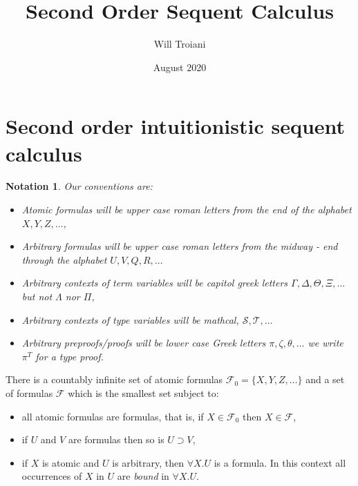 \documentclass[12pt]{article}
\title{Second Order Sequent Calculus}
\author{Will Troiani}
\date{August 2020}
\numberwithin{thm}{subsection}
\numberwithin{defn}{subsection}
\numberwithin{lemma}{subsection}
\numberwithin{example}{subsection}
\newtheorem{notation}{Notation}
\numberwithin{notation}{subsection}
\numberwithin{cor}{subsection}
\numberwithin{remark}{subsection}
\numberwithin{condition}{subsection}
\numberwithin{question}{subsection}
\numberwithin{construction}{subsection}
\newcommand{\scr}[1]{\mathscr{#1}}
\newcommand{\call}[1]{\mathcal{#1}}
\newcommand{\imp}{\supset}
\theoremstyle{example}
\numberwithin{equation}{section}
\begin{document}
\maketitle

%

\section{Second order intuitionistic sequent calculus}

\begin{notation}
Our conventions are:
\begin{itemize}
    \item Atomic formulas will be upper case roman letters from the end of the alphabet $X,Y,Z, \hdots$,
    \item Arbitrary formulas will be upper case roman letters from the midway - end through the alphabet $U,V,Q,R, \hdots$
    \item Arbitrary contexts of term variables will be capitol greek letters $\Gamma, \Delta, \Theta, \Xi,\hdots$ but not $\Lambda$ nor $\Pi$,
    \item Arbitrary contexts of type variables will be mathcal, $\call{S},\call{T},\hdots$
    \item Arbitrary preproofs/proofs will be lower case Greek letters $\pi, \zeta, \theta, \hdots$ we write $\pi^T$ for a type proof.
\end{itemize}
\end{notation}
There is a countably infinite set of atomic formulas $\scr{F}_0 = \lbrace X, Y, Z,\hdots \rbrace$ and a set of formulas $\scr{F}$ which is the smallest set subject to:
\begin{itemize}
    \item all atomic formulas are formulas, that is, if $X \in \scr{F}_0$ then $X \in \scr{F}$,
    \item if $U$ and $V$ are formulas then so is $U \imp V$,
    \item if $X$ is atomic and $U$ is arbitrary, then $\forall X. U$ is a formula. In this context all occurrences of $X$ in $U$ are \emph{bound} in $\forall X. U$.
\end{itemize}
\end{document}
